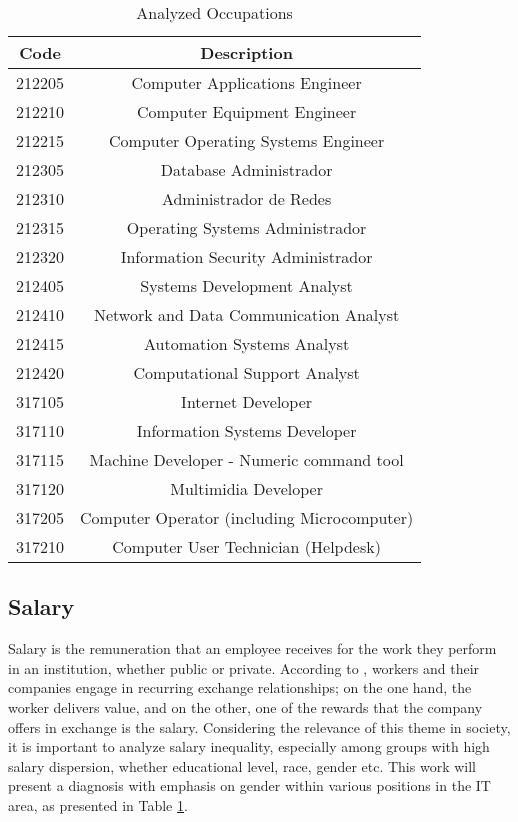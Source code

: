 \begin{table}[htbp]
	\caption{Analyzed Occupations}
	\begin{center}
		\begin{tabular}{|c|c|}
			\hline
			\textbf{Code} & \textbf{Description} \\ 
			\hline
				212205   & Computer Applications Engineer \\
				212210   & Computer Equipment Engineer  \\
				212215   & Computer Operating Systems Engineer \\
			\hline 										
				212305 & Database Administrador  \\
				212310 & Administrador de Redes  \\
				212315 & Operating Systems Administrador \\
				212320 & Information Security Administrador \\
			\hline 									
				212405 & Systems Development Analyst \\
				212410 & Network and Data Communication Analyst \\
				212415 & Automation Systems Analyst \\
				212420 & Computational Support Analyst \\
			\hline 									
				317105 & Internet Developer \\
				317110 & Information Systems Developer \\
				317115 & Machine Developer - Numeric command tool\\
				317120 & Multimidia Developer \\
			\hline 									
				317205 & Computer Operator (including Microcomputer) \\
				317210 & Computer User Technician (Helpdesk) \\
			\hline
		\end{tabular}
		\label{ocupacoes}
	\end{center}
\end{table}

\subsection{Salary}

Salary is the remuneration that an employee receives for the work they perform in an institution, whether public or private. According to \cite{kryscynski2021firm}, workers and their companies engage in recurring exchange relationships; on the one hand, the worker delivers value, and on the other, one of the rewards that the company offers in exchange is the salary.
Considering the relevance of this theme in society, it is important to analyze salary inequality, especially among groups with high salary dispersion, whether educational level, race, gender etc. This work will present a diagnosis with emphasis on gender within various positions in the IT area, as presented in Table \ref{ocupacoes}.

